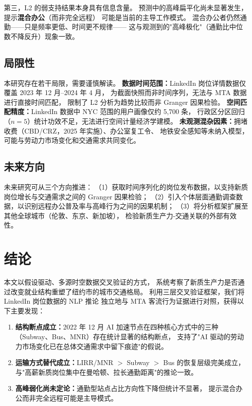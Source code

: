 \documentclass[runningheads]{llncs}
\begin{document}
第三，L2 的弱支持结果本身具有信息含量。
预测中的高峰扁平化尚未显著发生，提示\textbf{混合办公}（而非完全远程）
可能是当前的主导工作模式。
混合办公者仍然通勤——只是频率更低、时间更不规律——
这与观测到的"高峰极化"（通勤比中位数不降反升）现象一致。

\subsection{局限性}

本研究存在若干局限，需要谨慎解读。
\textbf{数据时间范围：}LinkedIn 岗位详情数据仅覆盖 2023 年 12 月--2024 年 4 月，
为截面快照而非时间序列，无法与 MTA 数据进行直接时间匹配，
限制了 L2 分析为趋势比较而非 Granger 因果检验。
\textbf{空间匹配精度：}LinkedIn 数据中 NYC 范围的用户画像仅约 5,700 条，
行政区分区回归（$n=5$）统计功效不足，无法进行空间计量经济学建模。
\textbf{未观测混杂因素：}拥堵收费（CBD/CRZ，2025 年实施）、办公室复工令、
地铁安全感知等未纳入模型，可能与劳动力市场变化和交通需求共同变化。

\subsection{未来方向}

未来研究可从三个方向推进：
（1）获取时间序列化的岗位发布数据，以支持新质岗位增长与交通需求之间的 Granger 因果检验；
（2）引入个体层面通勤调查数据，以识别远程办公普及率与高峰行为之间的因果机制；
（3）将分析框架扩展至其他全球城市（伦敦、东京、新加坡），
检验新质生产力-交通关联的外部有效性。

\section{结论}

本文以假设驱动、多源时空数据交叉验证的方式，
系统考察了新质生产力是否通过改变就业结构重塑了纽约市的城市交通格局。
利用三层交叉验证框架，我们将 LinkedIn 岗位数据的 NLP 推论
独立地与 MTA 客流行为证据进行对照，获得以下主要发现：

\begin{enumerate}
  \item \textbf{结构断点成立：}2022 年 12 月 AI 加速节点在四种核心方式中的三种
        （Subway、Bus、MNR）存在统计显著的结构断点，
        支持了"AI 驱动的劳动力市场变化已在总体交通需求中留下痕迹"的假说。
  \item \textbf{运输方式替代成立：}LIRR/MNR $>$ Subway $>$ Bus 的恢复层级完美成立，
        与"高薪新质岗位集中在曼哈顿、拉长通勤距离"的推论一致。
  \item \textbf{高峰弱化尚未定论：}通勤型站点占比方向性下降但统计不显著，
        提示混合办公而非完全远程可能是主导模式。
\end{enumerate}
\end{document}
